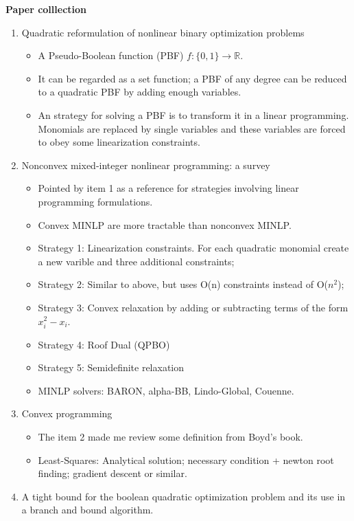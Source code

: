 \textbf{Paper colllection}
\begin{enumerate}
	\item{Quadratic reformulation of nonlinear binary optimization problems}
	\begin{itemize}
		\item{A Pseudo-Boolean function (PBF) $f:\{0,1\}\rightarrow \mathbb{R}$.}
		\item{It can be regarded as a set function; a PBF of any degree can be reduced to a quadratic PBF by adding enough variables.}
		\item{An strategy for solving a PBF is to transform it in a linear programming. Monomials are replaced by single variables and these variables are forced to obey some linearization constraints. }
	\end{itemize}
	\item{Nonconvex mixed-integer nonlinear programming: a survey}
	\begin{itemize}
		\item{Pointed by item 1 as a reference for strategies involving linear programming formulations.}
		\item{Convex MINLP are more tractable than nonconvex MINLP.}
		\item{Strategy 1: Linearization constraints. For each quadratic monomial create a new varible and three additional constraints;}
		\item{Strategy 2: Similar to above, but uses O(n) constraints instead of O($n^2$);}
		\item{Strategy 3: Convex relaxation by adding or subtracting terms of the form $x_i^2-x_i$.}
		\item{Strategy 4: Roof Dual (QPBO) }
		\item{Strategy 5: Semidefinite relaxation}
		\item{MINLP solvers: BARON, alpha-BB, Lindo-Global, Couenne.}
	\end{itemize}
	\item{Convex programming}
	\begin{itemize}
		\item{The item 2 made me review some definition from Boyd's book.}
		\item{Least-Squares: Analytical solution; necessary condition + newton root finding; gradient descent or similar.}
	\end{itemize}
	\item{ A tight bound for the boolean quadratic optimization
problem and its use in a branch and bound algorithm.}
	\begin{itemize}

\end{itemize}
\end{enumerate}
